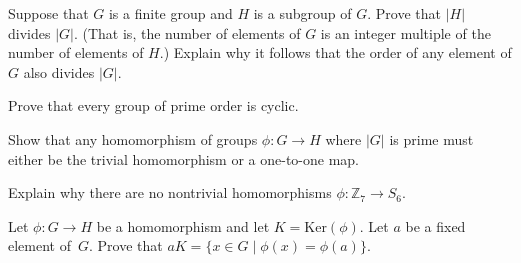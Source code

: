 \begin{problem}\label{prob:lagrange}
Suppose that \(G\) is a finite group and \(H\) is a subgroup of \(G\). Prove that \(\lvert H \rvert\) divides \(\lvert G \rvert\). (That is, the number of elements of \(G\) is an integer multiple of the number of elements of \(H\).) Explain why it follows that the order of any element of \(G\) also divides \(\lvert G \rvert \).
\begin{annotation}
\end{annotation}
\end{problem}

\begin{problem}\label{prob:primeordercyc}
Prove that every group of prime order is cyclic.
\begin{annotation}
\end{annotation}
\end{problem}

\begin{problem}
Show that any homomorphism of groups \(\phi : G \longrightarrow H\) where \(\lvert G \rvert \) is prime must either be the trivial homomorphism or a one-to-one map.
\end{problem}

\begin{problem}
Explain why there are no nontrivial homomorphisms \(\phi : \mathbb{Z}_7 \longrightarrow S_6 \).
\end{problem}

\begin{problem}\label{prob:kerneltoone}
Let \(\phi:G \longrightarrow H\) be a homomorphism and let \(K = \mbox{Ker}(\phi) \). Let \(a\) be a fixed element of~\(G\). Prove that \(aK = \{x\in G \mid \phi(x)=\phi(a) \} \).
\begin{annotation}
\end{annotation}
\end{problem}

